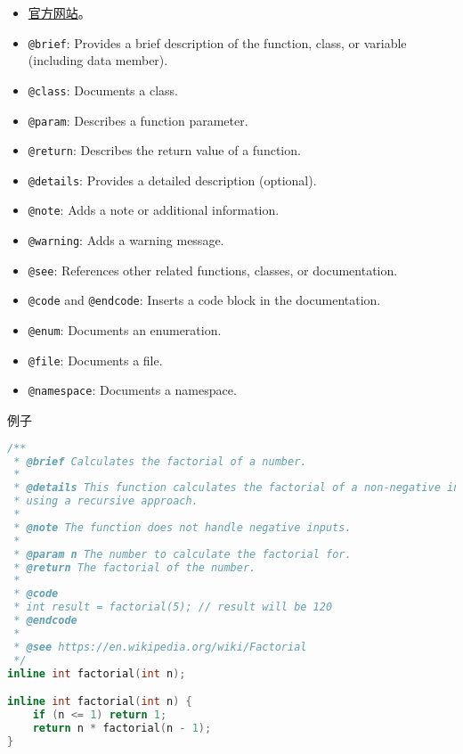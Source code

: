 
\begin{issues}
\issueDraft
\end{issues}

\begin{itemize}
\item \href{https://www.doxygen.nl/}{官方网站}。
\item \verb`@brief`: Provides a brief description of the function, class, or variable (including data member).
\item \verb`@class`: Documents a class.
\item \verb`@param`: Describes a function parameter.
\item \verb`@return`: Describes the return value of a function.
\item \verb`@details`: Provides a detailed description (optional).
\item \verb`@note`: Adds a note or additional information.
\item \verb`@warning`: Adds a warning message.
\item \verb`@see`: References other related functions, classes, or documentation.
\item \verb`@code` and \verb`@endcode`: Inserts a code block in the documentation.
\item \verb`@enum`: Documents an enumeration.
\item \verb`@file`: Documents a file.
\item \verb`@namespace`: Documents a namespace.
\end{itemize}

例子
\begin{lstlisting}[language=cpp,caption=factorial.hpp]
/**
 * @brief Calculates the factorial of a number.
 *
 * @details This function calculates the factorial of a non-negative integer
 * using a recursive approach.
 *
 * @note The function does not handle negative inputs.
 *
 * @param n The number to calculate the factorial for.
 * @return The factorial of the number.
 *
 * @code
 * int result = factorial(5); // result will be 120
 * @endcode
 *
 * @see https://en.wikipedia.org/wiki/Factorial
 */
inline int factorial(int n);

inline int factorial(int n) {
    if (n <= 1) return 1;
    return n * factorial(n - 1);
}
\end{lstlisting}

